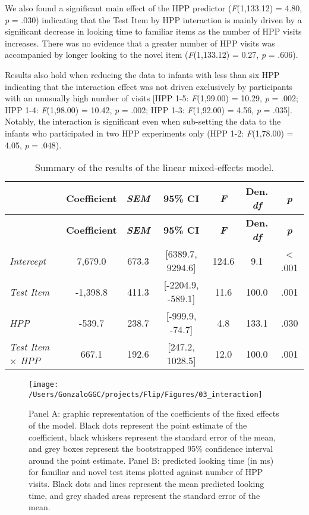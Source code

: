 \documentclass[english,man,man,floatsintext]{apa6}
\begin{document}
We also found a significant main effect of the HPP predictor (\emph{F}(1,133.12) = 4.80, \emph{p} = .030) indicating that the Test Item by HPP interaction is mainly driven by a significant decrease in looking time to familiar items as the number of HPP visits increases. There was no evidence that a greater number of HPP visits was accompanied by longer looking to the novel item (\emph{F}(1,133.12) = 0.27, \emph{p} = .606).

Results also hold when reducing the data to infants with less than six HPP indicating that the interaction effect was not driven exclusively by participants with an unusually high number of visits {[}HPP 1-5: \emph{F}(1,99.00) = 10.29, \emph{p} = .002; HPP 1-4: \emph{F}(1,98.00) = 10.42, \emph{p} = .002; HPP 1-3: \emph{F}(1,92.00) = 4.56, \emph{p} = .035{]}. Notably, the interaction is significant even when sub-setting the data to the infants who participated in two HPP experiments only (HPP 1-2: \emph{F}(1,78.00) = 4.05, \emph{p} = .048).

\begin{longtable}[]{@{}lcccccc@{}}
\caption{\label{tab:tab1}Summary of the results of the linear mixed-effects model.}\tabularnewline
\toprule
& \textbf{Coefficient} & \textbf{\emph{SEM}} & \textbf{95\% CI} & \textbf{\emph{F}} & \textbf{Den. \emph{df}} & \textbf{\emph{p}}\tabularnewline
\midrule
\endfirsthead
\toprule
& \textbf{Coefficient} & \textbf{\emph{SEM}} & \textbf{95\% CI} & \textbf{\emph{F}} & \textbf{Den. \emph{df}} & \textbf{\emph{p}}\tabularnewline
\midrule
\endhead
\emph{Intercept} & 7,679.0 & 673.3 & {[}6389.7, 9294.6{]} & 124.6 & 9.1 & \textless{} .001\tabularnewline
\emph{Test Item} & -1,398.8 & 411.3 & {[}-2204.9, -589.1{]} & 11.6 & 100.0 & .001\tabularnewline
\emph{HPP} & -539.7 & 238.7 & {[}-999.9, -74.7{]} & 4.8 & 133.1 & .030\tabularnewline
\emph{Test Item \(\times\) HPP} & 667.1 & 192.6 & {[}247.2, 1028.5{]} & 12.0 & 100.0 & .001\tabularnewline
\bottomrule
\end{longtable}

\begin{figure}
\texttt{[image: /Users/GonzaloGGC/projects/Flip/Figures/03\_interaction]} \caption{Panel A: graphic representation of the coefficients of the fixed effects of the model. Black dots represent the point estimate of the coefficient, black whiskers represent the standard error of the mean, and grey boxes represent the bootstrapped 95\% confidence interval around the point estimate. Panel B: predicted looking time (in ms) for familiar and novel test items plotted against number of HPP visits. Black dots and lines represent the mean predicted looking time, and grey shaded areas represent the standard error of the mean.}\label{fig:fig2}
\end{figure}
\end{document}
